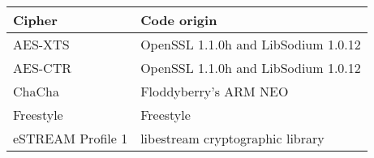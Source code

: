 


\begin{table}[t]
\begin{center}
\small
\centering
\begin{tabular}{l|l} 
\hline
{\bf Cipher} &  {\bf Code origin} \\
\hline
AES-XTS & OpenSSL 1.1.0h \cite{x} and LibSodium 1.0.12 \cite{x} \\
AES-CTR & OpenSSL 1.1.0h \cite{x} and LibSodium 1.0.12 \cite{x} \\
ChaCha  & Floddyberry's ARM NEO  \cite{Floodyberry} \\
Freestyle & Freestyle \cite{Freestle} \\
eSTREAM Profile 1 & libestream cryptographic library \cite{libestream} \\
\end{tabular}
\end{center}
\end{table}


